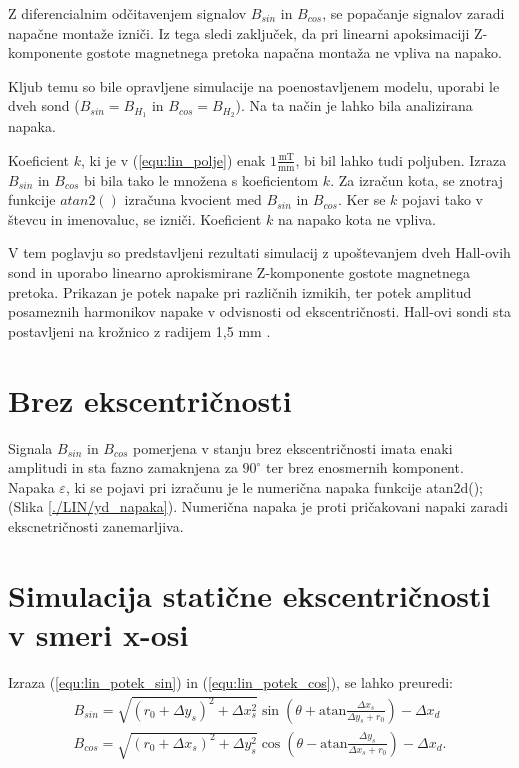 Z diferencialnim odčitavenjem signalov  $B_{sin}$ in $B_{cos}$, se popačanje signalov zaradi napačne montaže izniči. Iz tega sledi zaključek, da pri linearni apoksimaciji Z-komponente gostote magnetnega pretoka napačna montaža ne vpliva na napako.

Kljub temu so bile opravljene simulacije na poenostavljenem modelu, uporabi le dveh sond
 ($B_{sin}=B_{H_1}$ in $B_{cos}=B_{H_2}$). Na ta način je lahko bila analizirana napaka.
 
 Koeficient $k$, ki je v (\ref{equ:lin_polje}) enak $1 \frac{\mathrm{ mT}}{\mathrm{ mm}}$, bi bil lahko tudi poljuben.
 Izraza $B_{sin}$ in $B_{cos}$ bi bila tako le množena s koeficientom $k$. Za izračun kota, se znotraj funkcije $atan2()$ izračuna kvocient med $B_{sin}$ in $B_{cos}$. Ker se $k$ pojavi tako v števcu in imenovaluc, se izniči. Koeficient $k$ na napako kota ne vpliva.

V tem poglavju so predstavljeni rezultati simulacij z upoštevanjem dveh Hall-ovih sond in uporabo linearno aprokismirane Z-komponente gostote magnetnega pretoka.
Prikazan je potek napake pri različnih izmikih, ter potek amplitud posameznih harmonikov napake v odvisnosti od ekscentričnosti.
Hall-ovi sondi sta postavljeni na krožnico z radijem 1,5 mm \cite{AM8192}.
\section{Brez ekscentričnosti}
Signala $B_{sin}$ in $B_{cos}$ pomerjena v stanju brez ekscentričnosti imata enaki amplitudi in sta fazno zamaknjena za $90^{\circ}$ ter brez enosmernih komponent. Napaka $\varepsilon$, ki se pojavi pri izračunu je le numerična napaka funkcije atan2d(); (Slika \ref{./LIN/yd_napaka}). Numerična napaka je proti pričakovani napaki zaradi ekscnetričnosti zanemarljiva.
\newpage
\section{Simulacija statične ekscentričnosti v smeri x-osi}
Izraza (\ref{equ:lin_potek_sin}) in (\ref{equ:lin_potek_cos}), se lahko preuredi:
\begin{eqnarray}
\label{equ:linearna_atan_sin}
B_{sin}= \sqrt{(r_0+\Delta y_s)^2+\Delta x_s^2} \sin(\theta+  \mathrm{ atan} \frac{\Delta x_s}{\Delta y_s +r_0})-\Delta x_d\\
\label{equ:linearna_atan_cos}
B_{cos}= \sqrt{(r_0+\Delta x_s)^2+\Delta y_s^2} \cos(\theta-  \mathrm{ atan} \frac{\Delta y_s}{\Delta x_s +r_0}) -\Delta x_d.
\end{eqnarray}


